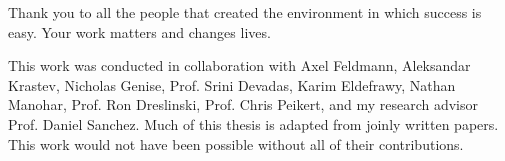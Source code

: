 Thank you to all the people that created the environment in which success is
easy. Your work matters and changes lives.

This work was conducted in collaboration with Axel Feldmann, Aleksandar
Krastev, Nicholas Genise, Prof. Srini Devadas, Karim Eldefrawy, Nathan Manohar,
Prof. Ron Dreslinski, Prof. Chris Peikert, and my research advisor Prof. Daniel
Sanchez. Much of this thesis is adapted from joinly written papers. This work
would not have been possible without all of their contributions.
